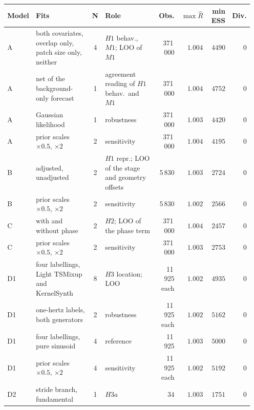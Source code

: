 \begin{table}[!tbp]
    \centering
    \footnotesize
    \setlength{\tabcolsep}{4pt}
    \renewcommand{\arraystretch}{1.12}
    \begin{tabular}{@{}l>{\raggedright\arraybackslash}p{5.4cm}c>{\raggedright\arraybackslash}p{3.6cm}rrrr@{}}
        \toprule
        \textbf{Model} & \textbf{Fits} & \textbf{N} & \textbf{Role} & \textbf{Obs.} & $\max\hat R$ & \textbf{min ESS} & \textbf{Div.} \\
        \midrule
        A & both covariates, overlap only, patch size only, neither & 4 & $H1$ behav., $M1$; LOO of $M1$ & 371\,000 & $1.004$ & $4490$ & $0$ \\
        \rowsep%
        A & net of the background-only forecast & 1 & agreement reading of $H1$ behav.\ and $M1$ & 371\,000 & $1.004$ & $4752$ & $0$ \\
        \rowsep%
        A & Gaussian likelihood & 1 & robustness & 371\,000 & $1.003$ & $4420$ & $0$ \\
        \rowsep%
        A & prior scales $\times0.5$, $\times2$ & 2 & sensitivity & 371\,000 & $1.004$ & $4195$ & $0$ \\
        \midrule
        B & adjusted, unadjusted & 2 & $H1$ repr.; LOO of the stage and geometry offsets & 5\,830 & $1.003$ & $2724$ & $0$ \\
        \rowsep%
        B & prior scales $\times0.5$, $\times2$ & 2 & sensitivity & 5\,830 & $1.002$ & $2566$ & $0$ \\
        \midrule
        C & with and without phase & 2 & $H2$; LOO of the phase term & 371\,000 & $1.004$ & $2457$ & $0$ \\
        \rowsep%
        C & prior scales $\times0.5$, $\times2$ & 2 & sensitivity & 371\,000 & $1.003$ & $2753$ & $0$ \\
        \midrule
        D1 & four labellings, Light TSMixup and KernelSynth & 8 & $H3$ location; LOO & 11\,925 each & $1.002$ & $4935$ & $0$ \\
        \rowsep%
        D1 & one-hertz labels, both generators & 2 & robustness & 11\,925 each & $1.002$ & $5162$ & $0$ \\
        \rowsep%
        D1 & four labellings, pure sinusoid & 4 & reference & 11\,925 & $1.003$ & $5000$ & $0$ \\
        \rowsep%
        D1 & prior scales $\times0.5$, $\times2$ & 4 & sensitivity & 11\,925 each & $1.002$ & $5192$ & $0$ \\
        \midrule
        D2 & stride branch, fundamental & 1 & $H3a$ & 34 & $1.003$ & $1751$ & $0$ \\

\end{tabular}
\end{table}
